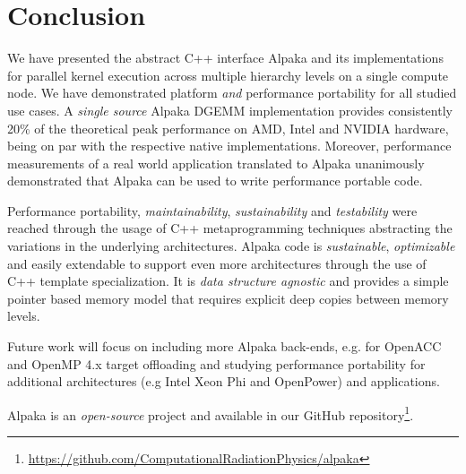 \documentclass[10pt, twocolumn]{article}
\newcommand{\alpaka}{Alpaka\xspace}
\newcommand{\nvidia}{{NVIDIA}\xspace}
\newcommand{\intel}{{Intel}\xspace}
\newcommand{\amd}{{AMD}\xspace}
\newcommand{\github}{{GitHub}\xspace}
\begin{document}
 \section{Conclusion}
We have presented the abstract C++ interface \alpaka and its implementations for parallel kernel execution across multiple hierarchy levels on a single compute node.
We have demonstrated platform \emph{and} performance portability for all studied use cases.
A \emph{single source} \alpaka DGEMM implementation provides consistently 20\% of the theoretical peak performance on \amd, \intel and \nvidia hardware, being on par with the respective native implementations.
Moreover, performance measurements of a real world application translated to \alpaka unanimously demonstrated that \alpaka can be used to write performance portable code.

Performance portability, \emph{maintainability}, \emph{sustainability} and \emph{testability} were reached through the usage of C++ metaprogramming techniques abstracting the variations in the underlying architectures.
\alpaka code is \emph{sustainable}, \emph{optimizable} and easily extendable to support even more architectures through the use of C++ template specialization.
It is \emph{data structure agnostic} and provides a simple pointer based memory model that requires explicit deep copies between memory levels.

Future work will focus on including more \alpaka back-ends, e.g. for OpenACC and OpenMP 4.x target offloading and studying
performance portability for additional architectures (e.g \intel Xeon Phi and OpenPower) and applications.

\alpaka is an \emph{open-source} project and available in our \github repository\footnote{\url{https://github.com/ComputationalRadiationPhysics/alpaka}}.
 

\end{document}
